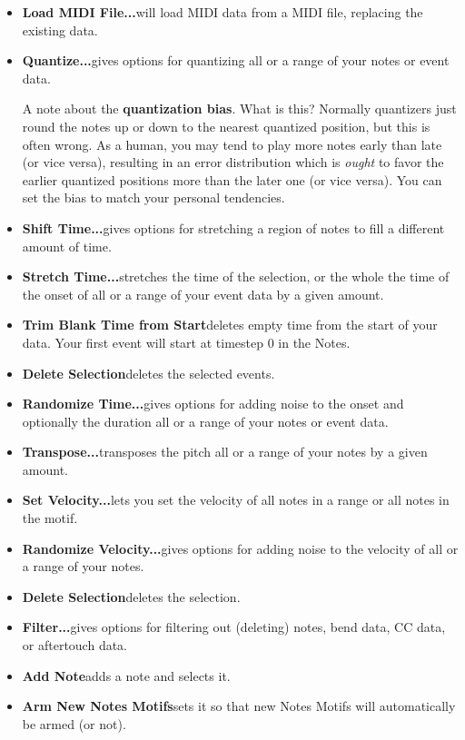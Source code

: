 \documentclass[twoside,10pt]{article}
\begin{document}
\begin{itemize}

\item{\bf Load MIDI File...}\quad will load MIDI data from a MIDI file, replacing the existing data.

\item{\bf Quantize...}\quad gives options for quantizing all or a range of your notes or event data. 

 A note about  the {\bf quantization bias}.  What is this?  Normally quantizers just round the notes up or down to the nearest quantized position, but this is often wrong.  As a human, you may tend to play more notes early than late (or vice versa), resulting in an error distribution which is {\it ought} to favor the earlier quantized positions more than the later one (or vice versa).  You can set the bias to match your personal tendencies.

\item{\bf Shift Time...}\quad gives options for stretching a region of notes to fill a different amount of time.

\item{\bf Stretch Time...}\quad stretches the time of the selection, or the whole  the time of the onset of all or a range of your event data by a given amount.

\item{\bf Trim Blank Time from Start}\quad deletes empty time from the start of your data.  Your first event will start at timestep 0 in the Notes.
\item{\bf Delete Selection}\quad deletes the selected events.

\item{\bf Randomize Time...}\quad gives options for adding noise to the onset and optionally the duration all or a range of your notes or event data.

\item{\bf Transpose...}\quad transposes the pitch all or a range of your notes by a given amount.

\item{\bf Set Velocity...}\quad lets you set the velocity of all notes in a range or all notes in the motif.

\item{\bf Randomize Velocity...}\quad gives options for adding noise to the velocity of all or a range of your notes.

\item{\bf Delete Selection}\quad deletes the selection.

\item{\bf Filter...}\quad gives options for filtering out (deleting) notes, bend data, CC data, or aftertouch data.

\item{\bf Add Note}\quad adds a note and selects it.

\item{\bf Arm New Notes Motifs}\quad sets it so that new Notes Motifs will automatically be armed (or not).

\end{itemize}
\end{document}
